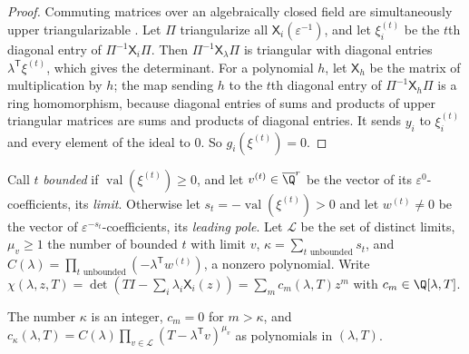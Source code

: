 \begin{proof}
Commuting matrices over an algebraically closed field are simultaneously
upper triangularizable \citep{horn2013-matrix-analysis}. Let $\Pi$ triangularize all
$\mathsf X_i(\varepsilon^{-1})$, and let $\xi^{(t)}_i$ be the $t$th diagonal entry of
$\Pi^{-1}\mathsf X_i\Pi$. Then $\Pi^{-1}\mathsf X_\lambda\Pi$ is triangular with diagonal
entries $\lambda^{\mathsf T}\xi^{(t)}$, which gives the determinant. For a
polynomial $h$, let $\mathsf X_h$ be the matrix of multiplication by $h$; the map
sending $h$ to the $t$th diagonal entry of $\Pi^{-1}\mathsf X_h\Pi$ is a ring
homomorphism, because diagonal entries of sums and products of upper triangular
matrices are sums and products of diagonal entries. It sends $y_i$ to
$\xi^{(t)}_i$ and every element of the ideal to $0$. So $g_i(\xi^{(t)})=0$.
\end{proof}

Call $t$ \emph{bounded} if $\operatorname{val}(\xi^{(t)})\ge0$, and let
$v^{(t)}\in\overline\Q^r$ be the vector of its $\varepsilon^0$-coefficients, its
\emph{limit}. Otherwise let $s_t=-\operatorname{val}(\xi^{(t)})>0$ and let
$w^{(t)}\ne0$ be the vector of $\varepsilon^{-s_t}$-coefficients, its
\emph{leading pole}. Let $\mathcal L$ be the set of distinct limits, $\mu_v\ge1$
the number of bounded $t$ with limit $v$, $\kappa=\sum_{t\text{ unbounded}}s_t$,
and $C(\lambda)=\prod_{t\text{ unbounded}}(-\lambda^{\mathsf T}w^{(t)})$, a nonzero
polynomial. Write
$\chi(\lambda,z,T)=\det(TI-\sum_i\lambda_i\mathsf X_i(z))=\sum_mc_m(\lambda,T)z^m$ with
$c_m\in\Q[\lambda,T]$.

\begin{lemma}\label{lem:int:leading}
The number $\kappa$ is an integer, $c_m=0$ for $m>\kappa$, and
$c_\kappa(\lambda,T)=C(\lambda)\prod_{v\in\mathcal L}(T-\lambda^{\mathsf T}v)^{\mu_v}$
as polynomials in $(\lambda,T)$.
\end{lemma}


